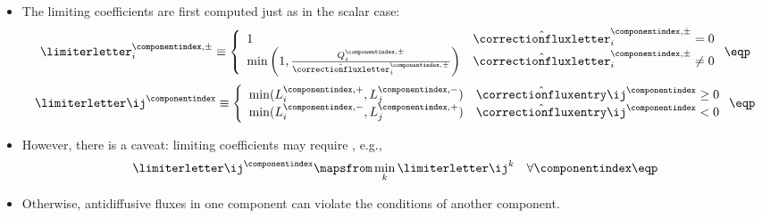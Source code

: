 \begin{itemize}
  \item The limiting coefficients are first computed just as in the scalar case:
    \begin{equation}
      \limiterletter_i^{\componentindex,\pm} \equiv\left\{
        \begin{array}{l l}
          1 & \hat{\correctionfluxletter}_i^{\componentindex,\pm} = 0\\
          \min\left(1,\frac{Q_i^{\componentindex,\pm}}
            {\hat{\correctionfluxletter}_i^{\componentindex,\pm}}\right) &
          \hat{\correctionfluxletter}_i^{\componentindex,\pm} \ne 0
        \end{array}
      \right. \eqp
    \end{equation}
    \begin{equation}
      \limiterletter\ij^\componentindex \equiv\left\{
        \begin{array}{l l}
          \min(L_i^{\componentindex,+},L_j^{\componentindex,-}) &
            \hat{\correctionfluxentry}\ij^\componentindex \geq 0\\
          \min(L_i^{\componentindex,-},L_j^{\componentindex,+}) &
            \hat{\correctionfluxentry}\ij^\componentindex < 0
        \end{array}
      \right. \eqp
    \end{equation}
  \item However, there is a caveat: limiting coefficients may require
    , e.g.,
    \begin{equation}
      \limiterletter\ij^\componentindex \mapsfrom
        \min\limits_k\limiterletter\ij^k \quad \forall\componentindex \eqp
    \end{equation}
  \item Otherwise, antidiffusive fluxes in one component can violate the
    conditions of another component.
\end{itemize}
